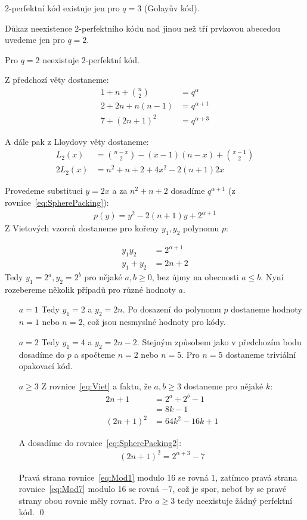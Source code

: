 \vt $2$-perfektní kód existuje jen pro $q = 3$ (Golayův kód).

Důkaz neexistence $2$-perfektního kódu nad jinou než tří prvkovou abecedou uvedeme jen pro $q = 2$.

\vt Pro $q=2$ neexistuje $2$-perfektní kód.

\dk Z předchozí věty dostaneme:
\begin{align}
	1 + n + {n \choose 2} &= q^\alpha  \\
	2 + 2n + n(n-1) &= q^{\alpha + 1} \label{eq:SpherePacking}\\
	7 + (2n + 1)^2 &=q^{\alpha + 3} \label{eq:SpherePacking2}
\end{align}

A dále pak z Lloydovy věty dostaneme:
\begin{align*}
L_2(x) &= {n - x \choose 2} - (x - 1)(n -x) + {x - 1 \choose 2} \\
2L_2(x) &= n^2 + n + 2 + 4x^2 - 2(n + 1)2x
\end{align*}

Provedeme substituci $y = 2x$ a za $n^2 + n + 2$ dosadíme $q^{\alpha + 1}$ (z rovnice~\ref{eq:SpherePacking}):
\begin{align*}
p(y) = y^2 - 2(n+1)y + 2^{\alpha + 1}
\end{align*}
Z Vietových vzorců dostaneme pro kořeny $y_1, y_2$ polynomu $p$:

\begin{align}
y_1y_2 &= 2^{\alpha + 1} \\
y_1 + y_2 &= 2n + 2 \label{eq:Viet}
\end{align}
Tedy $y_1 = 2^a, y_2 = 2^b$ pro nějaké $a,b \geq 0$, bez újmy na obecnosti $a \leq b$. Nyní rozebereme několik případů pro různé hodnoty $a$.

\begin{itemize}
\item[$a = 1$]
Tedy $y_1 = 2$ a $y_2 = 2n$. Po dosazení do polynomu $p$ dostaneme hodnoty $n = 1$ nebo $n = 2$, což jsou nesmyslné hodnoty pro kódy.
\item[$a = 2$]
Tedy $y_1 = 4$ a $y_2 = 2n -2$. Stejným způsobem jako v předchozím bodu dosadíme do $p$ a spočteme $n = 2$ nebo $n = 5$. Pro $n = 5$ dostaneme triviální opakovací kód.
\item[$a \geq 3$]
Z rovnice~\ref{eq:Viet} a faktu, že $a,b\geq 3$ dostaneme pro nějaké $k$:
\begin{align}
2n + 1 &= 2^a + 2^b - 1 \\
&= 8k - 1 \\
(2n + 1)^2 &= 64k^2 - 16k + 1 \label{eq:Mod1}
\end{align}

A dosadíme do rovnice~\ref{eq:SpherePacking2}:
\begin{align}
(2n + 1)^2 = 2^{\alpha + 3} - 7 \label{eq:Mod7}
\end{align}

Pravá strana rovnice~\ref{eq:Mod1} modulo 16 se rovná $1$, zatímco pravá strana rovnice~\ref{eq:Mod7} modulo 16 se rovná $-7$, což je spor, neboť by se pravé strany obou rovnic měly rovnat. Pro $a \geq 3$ tedy neexistuje žádný perfektní kód. \qed

\end{itemize}


